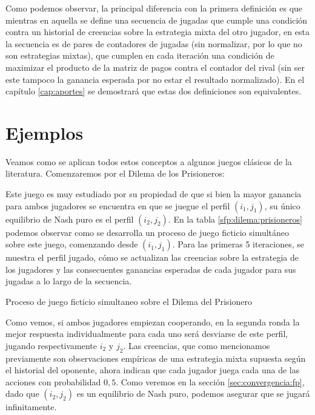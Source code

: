 Como podemos observar, la principal diferencia con la primera definición es que mientras en aquella se define una secuencia de jugadas que cumple una condición contra un historial de creencias sobre la estrategia mixta del otro jugador, en esta la secuencia es de pares de contadores de jugadas (sin normalizar, por lo que no son estrategias mixtas), que cumplen en cada iteración una condición de maximizar el producto de la matriz de pagos contra el contador del rival (sin ser este tampoco la ganancia esperada por no estar el resultado normalizado). En el capítulo \ref{cap:aportes} se demostrará que estas dos definiciones son equivalentes.



\section{Ejemplos}

Veamos como se aplican todos estos conceptos a algunos juegos clásicos de la literatura. Comenzaremos por el Dilema de los Prisioneros:




Este juego es muy estudiado por su propiedad de que si bien la mayor ganancia para ambos jugadores se encuentra en que se juegue el perfil $(i_1, j_1)$, su único equilibrio de Nash puro es el perfil $(i_2, j_2)$. En la tabla \ref{sfp:dilema:prisioneros} podemos observar como se desarrolla un proceso de juego ficticio simultáneo sobre este juego, comenzando desde $(i_1, j_1)$. Para las primeras 5 iteraciones, se muestra el perfil jugado, cómo se actualizan las creencias sobre la estrategia de los jugadores y las consecuentes ganancias esperadas de cada jugador para sus jugadas a lo largo de la secuencia.

\begin{table} %
    \centering
    
    \caption{Proceso de juego ficticio simultaneo sobre el Dilema del Prisionero}
    \label{sfp:dilema:prisioneros}
\end{table}

Como vemos, si ambos jugadores empiezan cooperando, en la segunda ronda la mejor respuesta individualmente para cada uno será desviarse de este perfil, jugando respectivamente $i_2$ y $j_2$. Las creencias, que como mencionamos previamente son observaciones empíricas de una estrategia mixta supuesta según el historial del oponente, ahora indican que cada jugador juega cada una de las acciones con probabilidad $0,5$. Como veremos en la sección \ref{sec:convergencia:fp}, dado que $(i_2, j_2)$ es un equilibrio de Nash puro, podemos asegurar que se jugará infinitamente.

